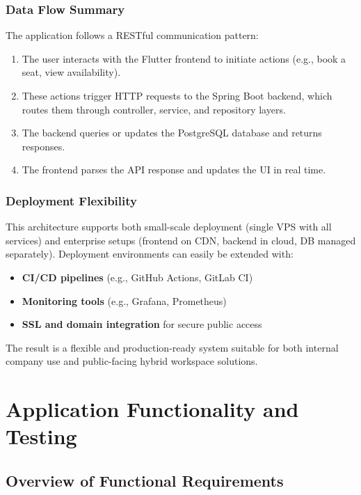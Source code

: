 \documentclass[12pt,a4paper]{report} %
\begin{document}
\subsection*{Data Flow Summary}

The application follows a RESTful communication pattern:
\begin{enumerate}
    \item The user interacts with the Flutter frontend to initiate actions (e.g., book a seat, view availability).
    \item These actions trigger HTTP requests to the Spring Boot backend, which routes them through controller, service, and repository layers.
    \item The backend queries or updates the PostgreSQL database and returns responses.
    \item The frontend parses the API response and updates the UI in real time.
\end{enumerate}

\subsection*{Deployment Flexibility}

This architecture supports both small-scale deployment (single VPS with all services) and enterprise setups (frontend on CDN, backend in cloud, DB managed separately). Deployment environments can easily be extended with:
\begin{itemize}
    \item \textbf{CI/CD pipelines} (e.g., GitHub Actions, GitLab CI)
    \item \textbf{Monitoring tools} (e.g., Grafana, Prometheus)
    \item \textbf{SSL and domain integration} for secure public access
\end{itemize}

The result is a flexible and production-ready system suitable for both internal company use and public-facing hybrid workspace solutions.

\newpage

\chapter{Application Functionality and Testing}

\section{Overview of Functional Requirements}
\end{document}
